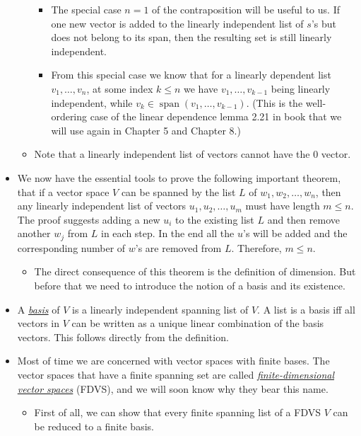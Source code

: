 \documentclass[11pt]{article}
\newcommand{\df}[1]{\ul{\textit{\textsf{#1}}}}
\newcommand{\s}{\operatorname{span}}
\begin{document}
\begin{itemize}
\begin{itemize}
        \begin{itemize}
            \item The special case $n=1$ of the contraposition will be useful to us. If one new vector is added to the linearly independent list of $s$'s but does not belong to its span, then the resulting set is still linearly independent.
            \item From this special case we know that for a linearly dependent list $v_1,\dots,v_n$, at some index $k \leq n$ we have $v_1,\dots,v_{k-1}$ being linearly independent, while $v_k \in \s(v_1,\dots,v_{k-1})$. (This is the well-ordering case of the linear dependence lemma 2.21 in book that we will use again in Chapter 5 and Chapter 8.)
        \end{itemize}
        \item Note that a linearly independent list of vectors cannot have the $0$ vector.
    \end{itemize}
    \item We now have the essential tools to prove the following important theorem, that if a vector space $V$ can be spanned by the list $L$ of $w_1, w_2, \dots,w_n$, then any linearly independent list of vectors $u_1,u_2,\dots,u_m$ must have length $m \leq n$. The proof suggests adding a new $u_i$ to the existing list $L$ and then remove another $w_j$ from $L$ in each step. In the end all the $u$'s will be added and the corresponding number of $w$'s are removed from $L$. Therefore, $m \leq n$.
    \begin{itemize}
        \item The direct consequence of this theorem is the definition of dimension. But before that we need to introduce the notion of a basis and its existence.
    \end{itemize}
    \item A \df{basis} of $V$ is a linearly independent spanning list of $V$. A list is a basis iff all vectors in $V$ can be written as a unique linear combination of the basis vectors. This follows directly from the definition.
    \item Most of time we are concerned with vector spaces with finite bases. The vector spaces that have a finite spanning set are called \df{finite-dimensional vector spaces} (FDVS), and we will soon know why they bear this name.
    \begin{itemize}
        \item First of all, we can show that every finite spanning list of a FDVS $V$ can be reduced to a finite basis.
        

\end{itemize}
\end{itemize}
\end{document}
